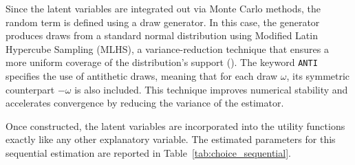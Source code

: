 \documentclass[12pt,a4paper]{article}
\begin{document}
Since the latent variables are integrated out via Monte Carlo methods,
the random term is defined using a draw generator. In this case, the
generator produces draws from a standard normal distribution using
Modified Latin Hypercube Sampling (MLHS), a variance-reduction
technique that ensures a more uniform coverage of the distribution's
support (\cite{Hess:2006aa}). The keyword \lstinline$ANTI$ specifies
the use of antithetic draws, meaning that for each draw \( \omega \),
its symmetric counterpart \( -\omega \) is also included. This
technique improves numerical stability and accelerates convergence by
reducing the variance of the estimator.

Once constructed, the latent variables are incorporated into the
utility functions exactly like any other explanatory variable. The
estimated parameters for this sequential estimation are reported in
Table~\vref{tab:choice_sequential}.
\end{document}

